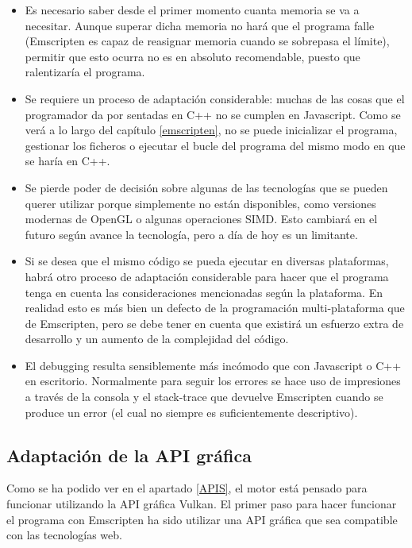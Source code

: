 \begin{itemize}
    \item Es necesario saber desde el primer momento cuanta memoria se va a necesitar. Aunque superar dicha memoria no hará que el programa falle (Emscripten es capaz de reasignar memoria cuando se sobrepasa el límite), permitir que esto ocurra no es en absoluto recomendable, puesto que ralentizaría el programa.
    
    \item Se requiere un proceso de adaptación considerable: muchas de las cosas que el programador da por sentadas en C++ no se cumplen en Javascript. Como se verá a lo largo del capítulo \ref{emscripten}, no se puede inicializar el programa, gestionar los ficheros o ejecutar el bucle del programa del mismo modo en que se haría en C++.
    
    \item Se pierde poder de decisión sobre algunas de las tecnologías que se pueden querer utilizar porque simplemente no están disponibles, como versiones modernas de OpenGL o algunas operaciones SIMD. Esto cambiará en el futuro según avance la tecnología, pero a día de hoy es un limitante.
    
    \item Si se desea que el mismo código se pueda ejecutar en diversas plataformas, habrá otro proceso de adaptación considerable para hacer que el programa tenga en cuenta las consideraciones mencionadas según la plataforma. En realidad esto es más bien un defecto de la programación multi-plataforma que de Emscripten, pero se debe tener en cuenta que existirá un esfuerzo extra de desarrollo y un aumento de la complejidad del código.
    
    \item El debugging resulta sensiblemente más incómodo que con Javascript o C++ en escritorio. Normalmente para seguir los errores se hace uso de impresiones a través de la consola y el stack-trace que devuelve Emscripten cuando se produce un error (el cual no siempre es suficientemente descriptivo).
\end{itemize}

\subsection{Adaptación de la API gráfica}
Como se ha podido ver en el apartado \ref{APIS}, el motor está pensado para funcionar utilizando la API gráfica Vulkan. El primer paso para hacer funcionar el programa con Emscripten ha sido utilizar una API gráfica que sea compatible con las tecnologías web.

